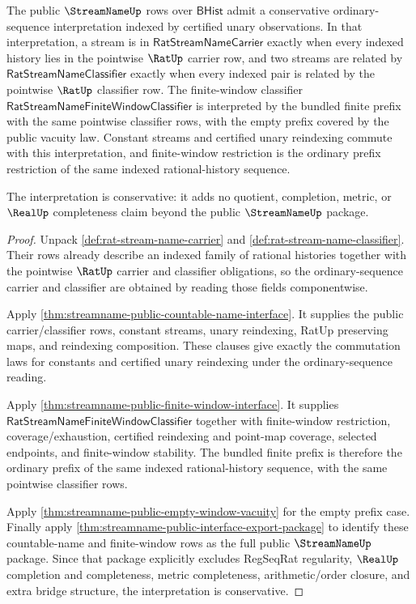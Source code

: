 \begin{theorem}
\label{thm:streamname-standard-sequence-bridge}
The public $\StreamNameUp$ rows over $\mathsf{BHist}$ admit a conservative
ordinary-sequence interpretation indexed by certified unary observations.  In
that interpretation, a stream is in
$\mathsf{RatStreamNameCarrier}$ exactly when every indexed history lies in the
pointwise $\RatUp$ carrier row, and two streams are related by
$\mathsf{RatStreamNameClassifier}$ exactly when every indexed pair is related
by the pointwise $\RatUp$ classifier row.  The finite-window classifier
$\mathsf{RatStreamNameFiniteWindowClassifier}$ is interpreted by the bundled
finite prefix with the same pointwise classifier rows, with the empty prefix
covered by the public vacuity law.  Constant streams and certified unary
reindexing commute with this interpretation, and finite-window restriction is
the ordinary prefix restriction of the same indexed rational-history sequence.

The interpretation is conservative: it adds no quotient, completion, metric,
or $\RealUp$ completeness claim beyond the public $\StreamNameUp$ package.
\end{theorem}

\begin{proof}
Unpack \autoref{def:rat-stream-name-carrier} and
\autoref{def:rat-stream-name-classifier}.  Their rows already describe an
indexed family of rational histories together with the pointwise
$\RatUp$ carrier and classifier obligations, so the ordinary-sequence carrier
and classifier are obtained by reading those fields componentwise.

Apply \autoref{thm:streamname-public-countable-name-interface}.  It supplies
the public carrier/classifier rows, constant streams, unary reindexing, RatUp
preserving maps, and reindexing composition.  These clauses give exactly the
commutation laws for constants and certified unary reindexing under the
ordinary-sequence reading.

Apply \autoref{thm:streamname-public-finite-window-interface}.  It supplies
$\mathsf{RatStreamNameFiniteWindowClassifier}$ together with finite-window
restriction, coverage/exhaustion, certified reindexing and point-map coverage,
selected endpoints, and finite-window stability.  The bundled finite prefix is
therefore the ordinary prefix of the same indexed rational-history sequence,
with the same pointwise classifier rows.

Apply \autoref{thm:streamname-public-empty-window-vacuity} for the empty
prefix case.  Finally apply
\autoref{thm:streamname-public-interface-export-package} to identify these
countable-name and finite-window rows as the full public $\StreamNameUp$
package.  Since that package explicitly excludes RegSeqRat regularity,
$\RealUp$ completion and completeness, metric completeness, arithmetic/order
closure, and extra bridge structure, the interpretation is conservative.
\end{proof}

